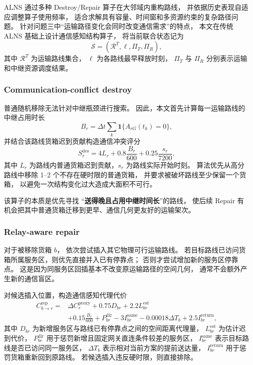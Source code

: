 ALNS 通过多种 Destroy/Repair 算子在大邻域内重构路线，
并依据历史表现自适应调整算子使用频率，
适合求解具有容量、时间窗和多资源约束的复杂路径问题\cite{q3-ropke2006}。
针对问题三中“运输路径变化会同时改变通信需求”的特点，
本文在传统 ALNS 基础上设计通信感知结构算子，
将当前联合状态记为
\[
\mathcal S
=(\mathcal R^T,\boldsymbol{\ell},\Pi_T,\Pi_R),
\]
其中 $\mathcal R^T$ 为运输路线集合，
$\boldsymbol{\ell}$ 为各路线最早释放时刻，
$\Pi_T$ 与 $\Pi_R$ 分别表示运输和中继资源调度结果。

\subsubsection{Communication-conflict destroy}

普通随机移除无法针对中继瓶颈进行搜索。
因此，本文首先计算每一运输路线的中继占用时长
\begin{equation}
B_r
=\Delta t
\sum_{k}
\mathbf 1\{A_{rG}(t_k)=0\},
\label{eq:q3-relay-burden}
\end{equation}
并结合该路线货箱迟到贡献构造通信冲突评分
\begin{equation}
S_r^{\mathrm{des}}
=4L_r
+0.8\frac{B_r}{600}
+0.25\frac{s_r}{7200},
\label{eq:q3-destroy-score}
\end{equation}
其中 $L_r$ 为路线内普通货箱迟到贡献，$s_r$ 为路线实际开始时刻。
算法优先从高分路线中移除 1--2 个不存在硬时限的普通货箱，
并要求被破坏路线至少保留一个货箱，
以避免一次结构变化过大造成大面积不可行。

该算子的本质是优先寻找
“\textbf{送得晚且占用中继时间长}”的路线，
使后续 Repair 有机会把其中普通货箱迁移到更早、通信几何更友好的运输架次。

\subsubsection{Relay-aware repair}

对于被移除货箱 $b$，
依次尝试插入其它物理可行运输路线。
若目标路线已访问货箱所属服务区，则优先直接并入已有停靠点；
否则才尝试增加新的服务区停靠点。
这是因为同服务区回插基本不改变原运输路径的空间几何，
通常不会额外产生新的通信盲区。

对候选插入位置，构造通信感知代理代价
\begin{equation}
\begin{aligned}
C_{b\rightarrow r}^{\mathrm{rep}}
={}&\Delta C_{r}^{\mathrm{proxy}}
+0.75D_{br}
+2.2L_{br}^{\mathrm{est}} \\
&+0.15\frac{B_r}{600}
+P_{br}^{\mathrm{dir}}
-3I_{br}^{\mathrm{same}}
-0.00018\Delta T_b
+2.5I_{br}^{\mathrm{return}},
\end{aligned}
\label{eq:q3-repair-score}
\end{equation}
其中 $D_{br}$ 为新增服务区与路线已有停靠点之间的空间距离代理量，
$L_{br}^{\mathrm{est}}$ 为估计迟到代价，
$P_{br}^{\mathrm{dir}}$ 用于惩罚新增且固定网关直连条件较差的服务区，
$I_{br}^{\mathrm{same}}$ 表示目标路线是否已访问同一服务区，
$\Delta T_b$ 表示相对当前方案的提前送达量，
$I_{br}^{\mathrm{return}}$ 用于惩罚货箱重新回到原路线。
若候选插入违反硬时限，则直接排除。

